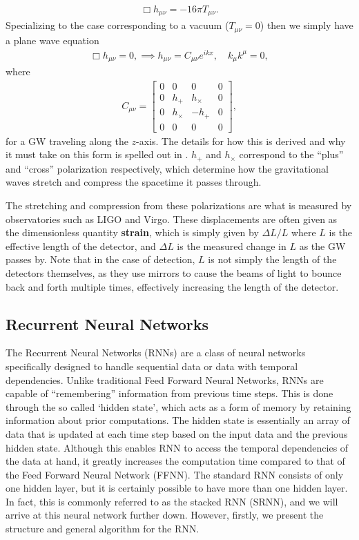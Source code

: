\documentclass[%
reprint,
amsmath,amssymb,
aps,
]{revtex4-2}
\begin{document}
\begin{align}
	\Box h_{\mu\nu}=-16\pi T_{\mu\nu}.
\end{align}
Specializing to the case corresponding to a vacuum ($T_{\mu\nu}=0$) then we simply have a plane wave equation
\begin{align}
	\Box h_{\mu\nu}=0,\implies h_{\mu\nu}=C_{\mu\nu}e^{ikx},\quad k_\mu k^\mu=0,
\end{align}
where
\begin{align}
	C_{\mu\nu}=\begin{bmatrix}
		0&0&0&0\\
		0&h_+&h_\times&0\\
		0&h_\times&-h_+&0\\
		0&0&0&0
	\end{bmatrix},
\end{align}
for a GW traveling along the $z$-axis. The details for how this is derived and why it must take on this form is spelled out in \cite{Carroll}. $h_+$ and $h_\times$ correspond to the ``plus'' and ``cross'' polarization respectively, which determine how the gravitational waves stretch and compress the spacetime it passes through. 

The stretching and compression from these polarizations are what is measured by observatories such as LIGO and Virgo. These displacements are often given as the dimensionless quantity \textbf{strain}, which is simply given by $\Delta L/L$ where $L$ is the effective length of the detector, and $\Delta L$ is the measured change in $L$ as the GW passes by. Note that in the case of detection, $L$ is not simply the length of the detectors themselves, as they use mirrors to cause the beams of light to bounce back and forth multiple times, effectively increasing the length of the detector.


\subsection{Recurrent Neural Networks}
\label{sec:RNNs}
The Recurrent Neural Networks (RNNs) are a class of neural networks specifically designed to handle sequential data or data with temporal dependencies. Unlike traditional Feed Forward Neural Networks, RNNs are capable of ``remembering'' information from previous time steps. This is done through the so called `hidden state', which acts as a form of memory by retaining information about prior computations. The hidden state is essentially an array of data that is updated at each time step based on the input data and the previous hidden state. Although this enables RNN to access the temporal dependencies of the data at hand, it greatly increases the computation time compared to that of the Feed Forward Neural Network (FFNN). The standard RNN consists of only one hidden layer, but it is certainly possible to have more than one hidden layer. In fact, this is commonly referred to as the stacked RNN (SRNN), and we will arrive at this neural network further down. However, firstly, we present the structure and general algorithm for the RNN.
\end{document}
